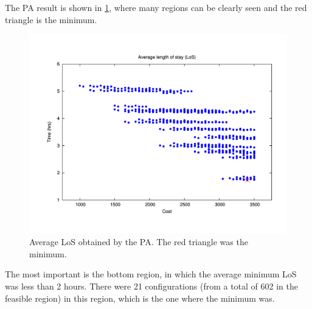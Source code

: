 The PA result is shown in \ref{subfig:pipe13-1}, where many regions
can be clearly seen and the red triangle is the minimum. 
\begin{figure}[H]
\noindent \begin{centering}
\includegraphics[width=0.95\columnwidth,height=0.25\paperheight]{figs4/v0/pipe-sorted-LoS_0-75_min}
\par\end{centering}

\caption{Average LoS obtained by the PA. The red triangle was the minimum.
\label{subfig:pipe13-1}}
\end{figure}
 The most important is the bottom region, in which the average minimum
LoS was less than 2 hours. There were 21 configurations (from a total
of 602 in the feasible region) in this region, which is the one where
the minimum was.

